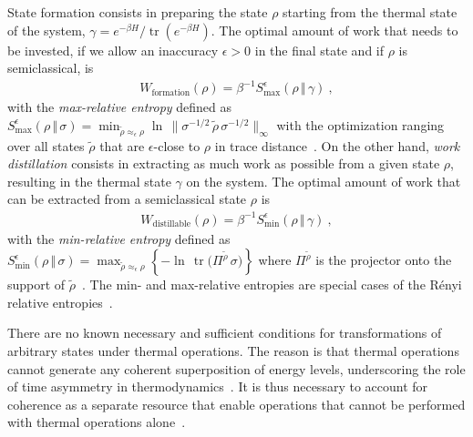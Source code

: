 \documentclass[prl,reprint,longbibliography,superscriptaddress]{revtex4-1}
\begin{document}
State formation consists in preparing the state $\rho$ starting from the thermal
state of the system, $\gamma={e}^{-\beta H}/\operatorname{tr}({e}^{-\beta H})$.  The optimal
amount of work that needs to be invested, if we allow an inaccuracy $\epsilon>0$
in the final state and if $\rho$ is semiclassical,
is~\cite{Aberg2013_worklike,Horodecki2013_ThermoMaj}
\begin{align}
  W_{\mathrm{formation}}(\rho) = \beta^{-1}{S}_{\mathrm{max}}^{\epsilon}(\rho\,\Vert\,\gamma)\ ,
  \label{eq:Wformation-Dmax}
\end{align}
with the \emph{max-relative entropy} defined as
${S}_{\mathrm{max}}^{\epsilon}(\rho\,\Vert\,\sigma)
= \min_{\tilde\rho\approx_\epsilon\rho}
\ln\, \bigl\lVert { \sigma^{-1/2}\,\tilde\rho\,\sigma^{-1/2} }\bigr\rVert _{\infty}$
with the optimization ranging over all states $\tilde\rho$ that are
$\epsilon$-close to $\rho$ in trace distance~\cite{Datta2009IEEE_minmax}.  
On the other hand, \emph{work distillation} consists in extracting as much work
as possible from a given state $\rho$, resulting in the thermal state $\gamma$
on the system.  The optimal amount of work that can be extracted from a
semiclassical state $\rho$ is~\cite{Aberg2013_worklike,Horodecki2013_ThermoMaj}
\begin{align}
  W_{\mathrm{distillable}}(\rho) =
  \beta^{-1}{S}_{\mathrm{min}}^{\epsilon}(\rho\,\Vert\,\gamma)\ ,
\end{align}
with the \emph{min-relative entropy} defined as
${S}_{\mathrm{min}}^{\epsilon}(\rho\,\Vert\,\sigma)
= \max_{\tilde\rho\approx_\epsilon\rho} \mathopen{}\left\{
  -\ln\, \operatorname{tr}\bigl(\Pi^{\tilde\rho}\,\sigma\bigr)
\right\}\mathclose{}$
where $\Pi^{\tilde\rho}$ is the projector onto the support of
$\tilde\rho$~\cite{Datta2009IEEE_minmax}.
The min- and max-relative entropies are special cases of the R\'enyi relative
entropies~\cite{Renyi1960_MeasOfEntrAndInf,PhDTomamichel2012,BookTomamichel2016_Finite}.

There are no known necessary and sufficient conditions for transformations of
arbitrary states under thermal operations.  The reason is that thermal
operations 
cannot generate any coherent superposition of energy levels, underscoring the
role of time asymmetry in thermodynamics~\cite{Aberg2014PRL_catalytic,Marvian2014PRA_modes,Marvian2014NC_extending,Lostaglio2015NC_beyond,Korzekwa2016NJP_extraction,Gour2018NatComm_entropic,Marvian2018arXiv_distillation,Lostaglio2018arXiv_broadcast}.  It is thus necessary to account for coherence
as a separate resource that enable operations that cannot be performed with
thermal operations alone~\cite{Baumgratz2014PRL_coherence,Winter2016PRL_coherence,Dana2017PRA_beyond,Diaz2018Qu_reusing,Popescu2018PTRSA_applications}.
\end{document}

